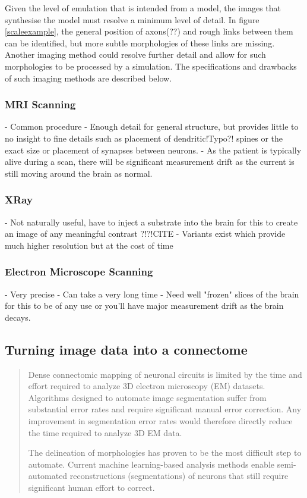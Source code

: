 Given the level of emulation that is intended from a model, the images that
synthesise the model must resolve a minimum level of detail. In figure
\ref{scaleexample}, the general position of axons(??) and rough links between
them can be identified, but more subtle morphologies of these links are missing.
Another imaging method could resolve further detail and allow for such
morphologies to be processed by a simulation. The specifications and drawbacks
of such imaging methods are described below.

\subsubsection*{MRI Scanning}

- Common procedure
- Enough detail for general structure, but provides little to no insight to fine
details such as placement of dendritic!Typo?! spines or the exact size or placement of
synapses between neurons.
- As the patient is typically alive during a scan, there will be significant
measurement drift as the current is still moving around the brain as normal.

\subsubsection*{XRay}

- Not naturally useful, have to inject a substrate into the brain for this to
create an image of any meaningful contrast ?!?!CITE
- Variants exist which provide much higher resolution but at the cost of time 

\subsubsection*{Electron Microscope Scanning}

- Very precise
- Can take a very long time
- Need well "frozen" slices of the brain for this to be of any use or you'll
have major measurement drift as the brain decays.

\subsection{Turning image data into a connectome}

\begin{quote}
    Dense connectomic mapping of neuronal circuits is limited by the time and
    effort required to analyze 3D electron microscopy (EM) datasets. Algorithms
    designed to automate image segmentation suffer from substantial error rates
    and require significant manual error correction. Any improvement in
    segmentation error rates would therefore directly reduce the time required
    to analyze 3D EM data.
    \autocite{pallotto_extracellular_2015} 

    The delineation of morphologies has proven to be the most difficult step to
    automate. Current machine learning-based analysis methods enable
    semi-automated reconstructions (segmentations) of neurons that still require
    significant human effort to correct.
    \autocite{helmstaedter_connectomic_2013}
\end{quote}

